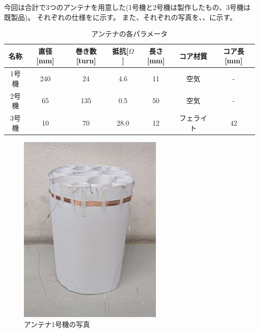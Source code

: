 \documentclass[report.tex]{subfiles}
\begin{document}
今回は合計で3つのアンテナを用意した(1号機と2号機は製作したもの、3号機は既製品)。
それぞれの仕様をに示す。
また、それぞれの写真を、、に示す。

\begin{table}[H]
	\centering
	\caption{アンテナの各パラメータ}
	\label{tab:ant}
	\begin{tabular}{ccccccc} \hline
		名称  & 直径[mm] & 巻き数[turn] & 抵抗[\(\Omega\)] & 長さ[mm] & コア材質  & コア長[mm] \\ \hline
		1号機 & 240    & 24        & 4.6            & 11     & 空気    & -       \\
		2号機 & 65     & 135       & 0.5            & 50     & 空気    & -       \\
		3号機 & 10     & 70        & 28.0           & 12     & フェライト & 42      \\ \hline
	\end{tabular}
\end{table}

\begin{figure}[H]
	\centering
	\includegraphics[width=7cm]{fig/1.jpg}
	\caption{アンテナ1号機の写真}
	\label{fig:1}
\end{figure}
\end{document}
